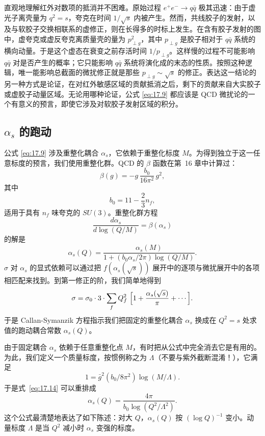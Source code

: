 直观地理解红外对数项的抵消并不困难。原始过程 $e^{+}e^{-}\to q\bar{q}$ 极其迅速：由于虚光子离壳量为 $q^2 = s$，夸克在时间 $1/\sqrt{s}$ 内被产生。然而，共线胶子的发射，以及与软胶子交换相联系的虚修正，则在长得多的时标上发生。在含有胶子发射的图中，虚夸克或虚反夸克离质量壳的量为 $p^2_{\perp g}$，其中 $p_{\perp g}$ 是胶子相对于 $q\bar{q}$ 系统的横向动量。于是这个虚态在衰变之前存活时间 $1/p_{\perp g}$。这样慢的过程不可能影响 $q\bar{q}$ 对是否产生的概率；它只能影响 $q\bar{q}$ 系统将演化成的末态的性质。按照这种逻辑，唯一能影响总截面的微扰修正就是那些 $p_{\perp g} \sim \sqrt{s}$ 的修正。表达这一结论的另一种方式是论证，在对红外敏感区域的贡献抵消之后，剩下的贡献来自大实胶子或虚胶子动量区域。无论用哪种论证，公式 \eqref{eq:17.9} 都应该是 QCD 微扰论的一个有意义的预言，即使它涉及对软胶子发射区域的积分。

\subsection{$\alpha_s$ 的跑动}

公式 \eqref{eq:17.9} 涉及重整化耦合 $\alpha_s$，它依赖于重整化标度 $M$。为得到独立于这一任意标度的预言，我们使用重整化群。QCD 的 $\beta$ 函数在第~16 章中计算过：
\begin{equation}
  \beta(g) = -g\,\frac{b_0}{16\pi^2}\,g^2 ,
  \label{eq:17.11}
\end{equation}
其中
\begin{equation}
  b_0 = 11 - \frac{2}{3}n_f ,
  \label{eq:17.12}
\end{equation}
适用于具有 $n_f$ 味夸克的 $SU(3)$。重整化群方程
\begin{equation}
  \frac{d\alpha_s}{d\log(Q/M)} = \beta(\alpha_s)
\end{equation}
的解是
\begin{equation}
  \alpha_s(Q) = \frac{\alpha_s(M)}{1 + (b_0\alpha_s/2\pi)\log(Q/M)} .
  \label{eq:17.14}
\end{equation}
$\sigma$ 对 $\alpha_s$ 的显式依赖可以通过把 $f(\alpha_s(\sqrt{s}))$ 展开中的逐项与微扰展开中的各项相匹配来找到。到第一修正的阶，我们简单地得到
\begin{equation}
  \sigma = \sigma_0\cdot 3\cdot \sum_f Q_f^2\ \Bigl[ 1 + \frac{\alpha_s
    (\sqrt{s})}{\pi} + \cdots \Bigr] .
  \label{eq:17.15}
\end{equation}
于是 Callan-Symanzik 方程指示我们把固定的重整化耦合 $\alpha_s$ 换成在 $Q^2 = s$ 处求值的跑动耦合常数 $\alpha_s(Q)$。

由于固定耦合 $\alpha_s$ 依赖于任意重整化点 $M$，有时把从公式中完全消去它是有用的。为此，我们定义一个质量标度，按惯例称之为 $\Lambda$（不要与紫外截断混淆！），它满足
\begin{equation}
  1 = \bar{g}^2(b_0/8\pi^2)\log(M/\Lambda) .
  \label{eq:17.16}
\end{equation}
于是式~\eqref{eq:17.14} 可以重排成
\begin{equation}
  \alpha_s(Q) = \frac{4\pi}{b_0\log(Q^2/\Lambda^2)} .
  \label{eq:17.17}
\end{equation}
这个公式最清楚地表达了如下陈述：对大 $Q$，$\alpha_s(Q)$ 按 $(\log Q)^{-1}$ 变小。动量标度 $\Lambda$ 是当 $Q^2$ 减小时 $\alpha_s$ 变强的标度。

